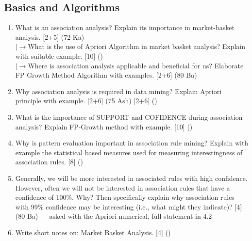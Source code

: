 \documentclass[12pt]{article}
\newcommand{\lb}{\\$\left|\rightarrow\right.$}
\begin{document}
  \subsection{Basics and Algorithms}
    \begin{enumerate}[topsep=0pt, noitemsep]
      \item What is an association analysis? Explain its importance in market-basket analysis. \hfill [2+5] (72 Ka)
        \lb What is the use of Apriori Algorithm in market basket analysis? Explain with suitable example. \hfill [10] ()
        \lb Where is association analysis applicable and beneficial for us? Elaborate FP Growth Method Algorithm with examples. \hfill [2+6] (80 Ba)

      \item Why association analysis is required in data mining? Explain Apriori principle with example. \hfill [2+6] (75 Ash) [2+6] ()

      \item What is the importance of SUPPORT and COFIDENCE during association analysis? Explain FP-Growth method with example. \hfill [10] ()

      \item Why is pattern evaluation important in association rule mining? Explain with example the statistical based measures used for measuring interestingness of association rules. \hfill [8] ()

      \item Generally, we will be more interested in associated rules with high confidence. However, often we will not be interested in association rules that have a confidence of 100\%. Why? Then specifically explain why association rules with 99\% confidence may be interesting (i.e., what might they indicate)? \hfill [4] (80 Ba) --- asked with the Apriori numerical, full statement in 4.2

      \item Write short notes on: Market Basket Analysis. \hfill [4] ()
    \end{enumerate}
\end{document}

